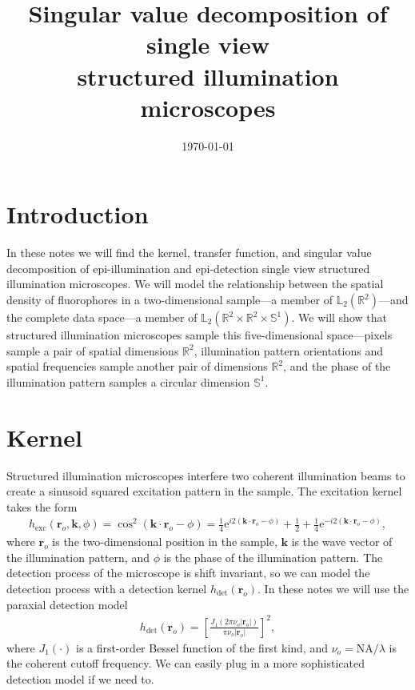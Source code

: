 \documentclass[11pt]{article}
\newcommand{\me}{\mathrm{e}}
\providecommand{\mb}[1]{\mathbf{#1}}
\providecommand{\ro}[1]{\mathbf{r}_o}
\providecommand{\mbb}[1]{\mathbb{#1}}
\begin{document}
\title{\vspace{-2.5em} Singular value decomposition of single view\\
  structured illumination
  microscopes\vspace{-1em}} %
\date{\vspace{-3em}\today\vspace{-1em}}
\maketitle
\section{Introduction}
In these notes we will find the kernel, transfer function, and singular value
decomposition of epi-illumination and epi-detection single view structured
illumination microscopes. We will model the relationship between the spatial
density of fluorophores in a two-dimensional sample---a member of
$\mbb{L}_2(\mbb{R}^2)$---and the complete data space---a member of
$\mbb{L}_2(\mbb{R}^2 \times \mbb{R}^2 \times \mbb{S}^1)$. We will show that
structured illumination microscopes sample this five-dimensional space---pixels
sample a pair of spatial dimensions $\mbb{R}^2$, illumination pattern
orientations and spatial frequencies sample another pair of dimensions
$\mbb{R}^2$, and the phase of the illumination pattern samples a circular
dimension $\mbb{S}^1$.

\section{Kernel}
Structured illumination microscopes interfere two coherent illumination beams to
create a sinusoid squared excitation pattern in the sample. The excitation
kernel takes the form
\begin{align}
  h_{\text{exc}}(\ro{}, \mb{k}, \phi) = \cos^2(\mb{k}\cdot\ro{} - \phi) = \frac{1}{4}\me{}^{i2(\mb{k} \cdot\ro{} - \phi)} + \frac{1}{2} + \frac{1}{4}\me{}^{-i2(\mb{k}\cdot\ro{} - \phi)},\label{eq:exc}
\end{align}
where $\ro{}$ is the two-dimensional position in the sample, $\mb{k}$ is the
wave vector of the illumination pattern, and $\phi$ is the phase of the
illumination pattern. The detection process of the microscope is shift
invariant, so we can model the detection process with a detection kernel
$h_{\text{det}}(\ro{})$. In these notes we will use the paraxial detection
model
\begin{align}
  h_{\text{det}}(\ro{}) = \left[\frac{J_1(2\pi\nu_o |\ro{}|)}{\pi\nu_o |\ro{}|}\right]^2,\label{eq:det}
\end{align}
where $J_1(\cdot)$ is a first-order Bessel function of the first kind, and
$\nu_o = \text{NA}/\lambda$ is the coherent cutoff frequency. We can easily plug
in a more sophisticated detection model if we need to.
\end{document}
